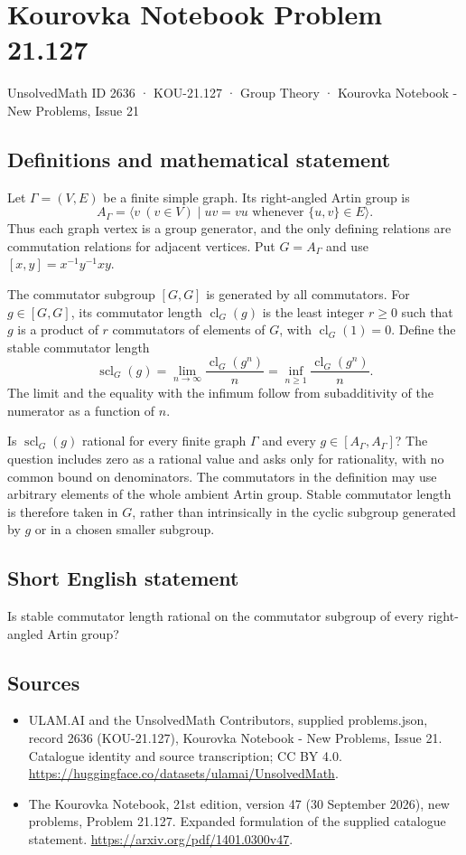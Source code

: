 \documentclass[11pt,a4paper]{article}
\begin{document}
\section*{Kourovka Notebook Problem 21.127}\label{2636}
{\small UnsolvedMath ID 2636 · KOU-21.127 · Group Theory · Kourovka Notebook - New Problems, Issue 21}
\subsection{Definitions and mathematical statement}
Let $\Gamma=(V,E)$ be a finite simple graph. Its right-angled Artin group is
\[
 A_\Gamma=\langle v\ (v\in V)\mid uv=vu\text{ whenever }\{u,v\}\in E\rangle.
\]
Thus each graph vertex is a group generator, and the only defining relations are commutation relations for adjacent vertices. Put $G=A_\Gamma$ and use $[x,y]=x^{-1}y^{-1}xy$.

The commutator subgroup $[G,G]$ is generated by all commutators. For $g\in[G,G]$, its commutator length $\operatorname{cl}_G(g)$ is the least integer $r\ge0$ such that $g$ is a product of $r$ commutators of elements of $G$, with $\operatorname{cl}_G(1)=0$. Define the stable commutator length
\[
 \operatorname{scl}_G(g)=\lim_{n\to\infty}
 \frac{\operatorname{cl}_G(g^n)}{n}
 =\inf_{n\ge1}\frac{\operatorname{cl}_G(g^n)}{n}.
\]
The limit and the equality with the infimum follow from subadditivity of the numerator as a function of $n$.

Is $\operatorname{scl}_G(g)$ rational for every finite graph $\Gamma$ and every $g\in[A_\Gamma,A_\Gamma]$? The question includes zero as a rational value and asks only for rationality, with no common bound on denominators. The commutators in the definition may use arbitrary elements of the whole ambient Artin group. Stable commutator length is therefore taken in $G$, rather than intrinsically in the cyclic subgroup generated by $g$ or in a chosen smaller subgroup.
\subsection{Short English statement}
Is stable commutator length rational on the commutator subgroup of every right-angled Artin group?
\subsection{Sources}
\begin{itemize}
\item[S1] ULAM.AI and the UnsolvedMath Contributors, supplied problems.json, record 2636 (KOU-21.127), Kourovka Notebook - New Problems, Issue 21. Catalogue identity and source transcription; CC BY 4.0.
\url{https://huggingface.co/datasets/ulamai/UnsolvedMath}.
\item[S2] The Kourovka Notebook, 21st edition, version 47 (30 September 2026), new problems, Problem 21.127. Expanded formulation of the supplied catalogue statement.
\url{https://arxiv.org/pdf/1401.0300v47}.
\end{itemize}
\end{document}
